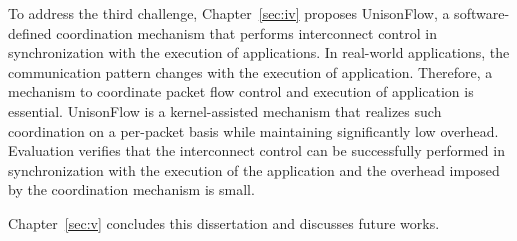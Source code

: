 To address the third challenge, Chapter~\ref{sec:iv} proposes UnisonFlow, a
software-defined coordination mechanism that performs interconnect control in
synchronization with the execution of applications. In real-world
applications, the communication pattern changes with the execution of
application. Therefore, a mechanism to coordinate packet flow control and
execution of application is essential. UnisonFlow is a kernel-assisted
mechanism that realizes such coordination on a per-packet basis while
maintaining significantly low overhead. Evaluation verifies that the
interconnect control can be successfully performed in synchronization with the
execution of the application and the overhead imposed by the coordination
mechanism is small.

Chapter~\ref{sec:v} concludes this dissertation and discusses future works.

\pagestyle{headings}
